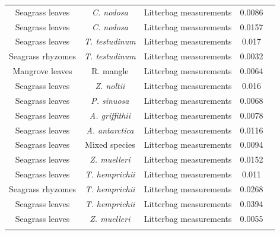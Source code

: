 \begin{table}[htbp]
\begin{tabular}{ccccc}
    Seagrass leaves & \textit{\textit{C. nodosa} } & Litterbag measurements & 0.0086 & \citealt{Perez:2001ue} \\

    Seagrass leaves & \textit{\textit{C. nodosa} } & Litterbag measurements & 0.0157 & \citealt{Perez:2001ue}\\

      \multicolumn{1}{c}{Seagrass leaves} & \textit{T. testudinum} & Litterbag measurements & 0.017 & \citealt{Fourqurean:2003wh} \\

    \multicolumn{1}{c}{Seagrass rhyzomes} & \textit{T. testudinum} & Litterbag measurements & 0.0032 & \citealt{Fourqurean:2003wh} \\

    \multicolumn{1}{c}{Mangrove leaves} & R. mangle  & Litterbag measurements & 0.0064 & \citealt{Fourqurean:2003wh} \\

    \multicolumn{1}{c}{Seagrass leaves} & \textit{Z. noltii} & Litterbag measurements & 0.016 & \citealt{Machas:2006wv} \\

    \multicolumn{1}{c}{Seagrass leaves} & \textit{P. sinuosa} & Litterbag measurements & 0.0068 & \citealt{Moore:2006wq} \\

    \multicolumn{1}{c}{Seagrass leaves} & \textit{A. griffithii} & Litterbag measurements & 0.0078 & \citealt{Moore:2006wq} \\

    \multicolumn{1}{c}{Seagrass leaves} & \textit{A. antarctica} & Litterbag measurements & 0.0116 & \citealt{Moore:2006wq} \\

    \multicolumn{1}{c}{Seagrass leaves} & Mixed species & Litterbag measurements & 0.0094 & \citealt{Moore:2006wq} \\

    Seagrass leaves & \textit{Z. muelleri}  & Litterbag measurements & 0.0152 & \citealt{Nicastro:2012wf} \\

    Seagrass leaves & \textit{T. hemprichii } & Litterbag measurements & 0.011 & \citealt{Chiu:2013uy} \\

    \multicolumn{1}{c}{Seagrass rhyzomes} & \textit{T. hemprichii } & Litterbag measurements & 0.0268 & \citealt{YANO:2013ta} \\
        \multicolumn{1}{c}{Seagrass leaves} & \textit{T. hemprichii } & Litterbag measurements & 0.0394 & \citealt{YANO:2013ta} \\

    Seagrass leaves & \textit{Z. muelleri } & Litterbag measurements & 0.0055 & \citealt{TrevathanTackett:2017cn} \\

    \noalign{\smallskip}\hline

 
    \end{tabular}%
  \label{tab:addlabel}%
\end{table}%

